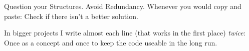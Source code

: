 
\begin{frame}
%
\begin{hintbox}[Conclusion]
Question your Structures. Avoid Redundancy. Whenever you would copy and paste: Check if there isn't a better solution.

In bigger projects I write almost each line (that works in the first place) \emph{twice}: Once as a concept and once to keep the code useable in the long run.
\end{hintbox}
%
\end{frame}